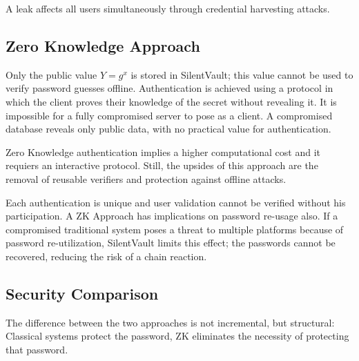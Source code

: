 \documentclass[conference]{IEEEtran}
\begin{document}
A leak affects all users simultaneously through credential harvesting attacks.

\subsection{Zero Knowledge Approach}

Only the public value $Y = g^x$ is stored in SilentVault; this value cannot be used to verify password guesses offline. Authentication is achieved using a protocol in which the client proves their knowledge of the secret without revealing it. It is impossible for a fully compromised server to pose as a client. A compromised database reveals only public data, with no practical value for authentication.

Zero Knowledge authentication implies a higher computational cost and it requiers an interactive protocol. Still, the upsides of this approach are the removal of reusable verifiers and protection against offline attacks.

Each authentication is unique and user validation cannot be verified without his participation.
A ZK Approach has implications on password re-usage also. If a compromised traditional system poses a threat to multiple platforms because of password re-utilization, SilentVault limits this effect; the passwords cannot be recovered, reducing the risk of a chain reaction.

\subsection{Security Comparison}

\begin{center}
\end{center}
The difference between the two approaches is not incremental, but structural: Classical systems protect the password, ZK eliminates the necessity of protecting that password.
\end{document}

